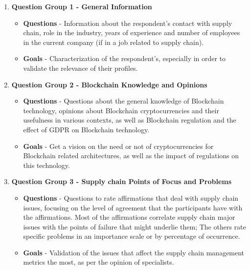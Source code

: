 \begin{enumerate}

\item \textbf{Question Group 1 - General Information}
	\begin{itemize}
	\item \textbf{Questions} - Information about the respondent's contact with supply chain, role in the industry, years of experience and number of employees in the current company (if in a job related to supply chain).
    \item \textbf{Goals} - Characterization of the respondent's, especially in order to validate the relevance of their profiles.
	\end{itemize}
    
\item \textbf{Question Group 2 - Blockchain Knowledge and Opinions}
	\begin{itemize}
	\item \textbf{Questions} - Questions about the general knowledge of Blockchain technology, opinions about Blockchain cryptocurrencies and their usefulness in various contexts, as well as Blockchain regulation and the effect of GDPR on Blockchain technology.
    \item \textbf{Goals} - Get a vision on the need or not of cryptocurrencies for Blockchain related architectures, as well as the impact of regulations on this technology.
	\end{itemize}
    
\item \textbf{Question Group 3 - Supply chain Points of Focus and Problems}
	\begin{itemize}
    \item \textbf{Questions} - Questions to rate affirmations that deal with supply chain issues, focusing on the level of agreement that the participants have with the affirmations. Most of the affirmations correlate supply chain major issues with the points of failure that might underlie them; The others rate specific problems in an importance scale or by percentage of occurrence.
    \item \textbf{Goals} - Validation of the issues that affect the supply chain management metrics the most, as per the opinion of specialists.
	\end{itemize}
    

\end{enumerate}
